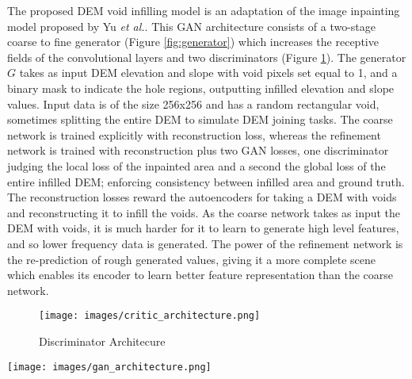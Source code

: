 \documentclass[twocolumn]{article}
\begin{document}
The proposed DEM void infilling model is an adaptation of the image inpainting model proposed by Yu \emph{et al.}\autocite{yuGenerativeImageInpainting2018}.
This GAN architecture consists of a two-stage coarse to fine generator (Figure \ref{fig:generator}) which increases the receptive fields of the convolutional layers and two discriminators (Figure \ref{fig:discriminator}).
The generator \(G\) takes as input DEM elevation and slope with void pixels set equal to 1, and a binary mask to indicate the hole regions, outputting infilled elevation and slope values.
Input data is of the size 256x256 and has a random rectangular void, sometimes splitting the entire DEM to simulate DEM joining tasks.
The coarse network is trained explicitly with reconstruction loss, whereas the refinement network is trained with reconstruction plus two GAN losses, one discriminator judging the local loss of the inpainted area and a second the global loss of the entire infilled DEM;  enforcing consistency between infilled area and ground truth.
The reconstruction losses reward the autoencoders for taking a DEM with voids and reconstructing it to infill the voids.
As the coarse network takes as input the DEM with voids, it is much harder for it to learn to generate high level features, and so lower frequency data is generated.
The power of the refinement network is the re-prediction of rough generated values, giving it a more complete scene which enables its encoder to learn better feature representation than the coarse network.

\begin{figure}[htbp]
\centering
\texttt{[image: images/critic\_architecture.png]}
\caption{\label{fig:discriminator}Discriminator Architecure}
\end{figure}

\begin{figure*}
\centering
\texttt{[image: images/gan\_architecture.png]}
\caption{\label{fig:generator}Generator Architecure}
\end{figure*}
\end{document}
